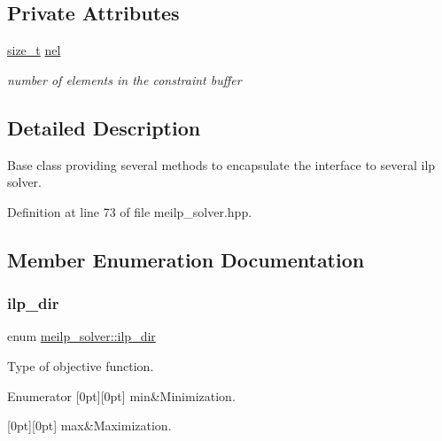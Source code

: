 \subsection*{Private Attributes}
\begin{DoxyCompactItemize}
\item 
\hyperlink{tutorial__fpt__2017_2intro_2sixth_2test_8c_a7c94ea6f8948649f8d181ae55911eeaf}{size\+\_\+t} \hyperlink{classmeilp__solver_a07eb267f2f15c0f56cb1941334c8421d}{nel}
\begin{DoxyCompactList}\small\item\em number of elements in the constraint buffer \end{DoxyCompactList}\end{DoxyCompactItemize}


\subsection{Detailed Description}
Base class providing several methods to encapsulate the interface to several ilp solver. 

Definition at line 73 of file meilp\+\_\+solver.\+hpp.



\subsection{Member Enumeration Documentation}
\mbox{\label{classmeilp__solver_a2f719db6577d73007d942af7e6fe907c}} 
\subsubsection{\texorpdfstring{ilp\+\_\+dir}{ilp\_dir}}
{\footnotesize\ttfamily enum \hyperlink{classmeilp__solver_a2f719db6577d73007d942af7e6fe907c}{meilp\+\_\+solver\+::ilp\+\_\+dir}}



Type of objective function. 

\begin{DoxyEnumFields}{Enumerator}
[0pt][0pt]{}\mbox{\label{classmeilp__solver_a2f719db6577d73007d942af7e6fe907cad3536e763fa5680af413985f8a18e961}} 
min&Minimization. \\
\hline

[0pt][0pt]{}\mbox{\label{classmeilp__solver_a2f719db6577d73007d942af7e6fe907caae8b9d75adb582264515691d95a5cb57}} 
max&Maximization. \\
\hline

\end{DoxyEnumFields}


